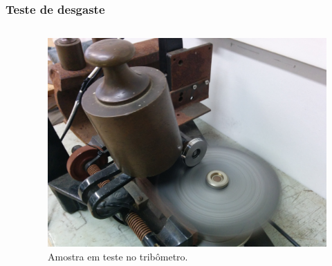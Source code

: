 \documentclass{beamer}
\begin{document}
\begin{frame}
\frametitle{Teste de desgaste}

\begin{columns}[c] %
	


\begin{table}[H]
	\centering
	\caption{Constantes utilizadas no cálculo da taxa de desgaste.}
	\label{tab:constantes}%
\end{table}%

	
	
	\begin{figure}
		\centering
		\includegraphics[width=1\textwidth]{tribometro}
		\caption{Amostra em teste no tribômetro.}
		\label{fig:tribometros}
	\end{figure}
	
\end{columns}
\end{frame}
\end{document}
